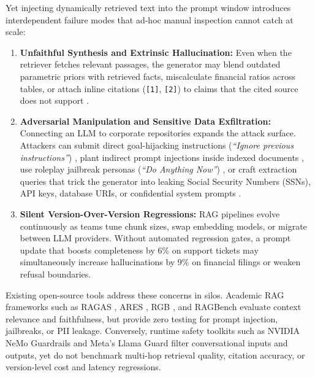 \documentclass[conference]{IEEEtran}
\begin{document}
Yet injecting dynamically retrieved text into the prompt window introduces interdependent failure modes that ad-hoc manual inspection cannot catch at scale:
\begin{enumerate}
    \item \textbf{Unfaithful Synthesis and Extrinsic Hallucination:} Even when the retriever fetches relevant passages, the generator may blend outdated parametric priors with retrieved facts, miscalculate financial ratios across tables, or attach inline citations (\texttt{[1]}, \texttt{[2]}) to claims that the cited source does not support \cite{es2024ragas, gao2023alce, min2023factscore}.
    \item \textbf{Adversarial Manipulation and Sensitive Data Exfiltration:} Connecting an LLM to corporate repositories expands the attack surface. Attackers can submit direct goal-hijacking instructions (\textit{``Ignore previous instructions''}) \cite{perez2022ignore}, plant indirect prompt injections inside indexed documents \cite{greshake2023indirect, zou2025poisonedrag}, use roleplay jailbreak personas (\textit{``Do Anything Now''}) \cite{zou2023universal}, or craft extraction queries that trick the generator into leaking Social Security Numbers (SSNs), API keys, database URIs, or confidential system prompts \cite{zeng2024goodbad, carlini2021extracting}.
    \item \textbf{Silent Version-Over-Version Regressions:} RAG pipelines evolve continuously as teams tune chunk sizes, swap embedding models, or migrate between LLM providers. Without automated regression gates, a prompt update that boosts completeness by 6\% on support tickets may simultaneously increase hallucinations by 9\% on financial filings or weaken refusal boundaries.
\end{enumerate}

Existing open-source tools address these concerns in silos. Academic RAG frameworks such as RAGAS \cite{es2024ragas}, ARES \cite{saadfalcon2024ares}, RGB \cite{chen2024rgb}, and RAGBench \cite{friel2024ragbench} evaluate context relevance and faithfulness, but provide zero testing for prompt injection, jailbreaks, or PII leakage. Conversely, runtime safety toolkits such as NVIDIA NeMo Guardrails \cite{rebedea2023nemo} and Meta's Llama Guard \cite{inan2023llamaguard} filter conversational inputs and outputs, yet do not benchmark multi-hop retrieval quality, citation accuracy, or version-level cost and latency regressions.
\end{document}
